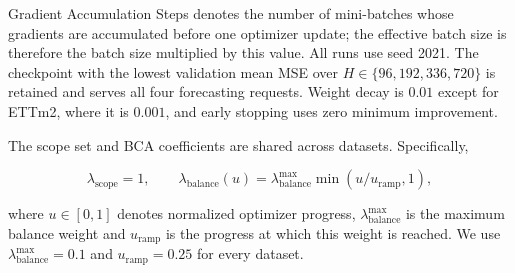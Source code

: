 \documentclass[final,3p,times]{elsarticle}
\begin{document}
Gradient Accumulation Steps denotes the number of mini-batches whose gradients are accumulated before one optimizer update; the effective batch size is therefore the batch size multiplied by this value. All runs use seed 2021. The checkpoint with the lowest validation mean MSE over $H\in\{96,192,336,720\}$ is retained and serves all four forecasting requests. Weight decay is $0.01$ except for ETTm2, where it is $0.001$, and early stopping uses zero minimum improvement.

\begin{table}[t]
\centering
\caption{UVHF configuration.}
\label{tab:model-settings}
\scriptsize
\setlength{\tabcolsep}{4pt}
\end{table}


The scope set and BCA coefficients are shared across datasets.
Specifically,

\begin{equation}
\lambda_{\mathrm{scope}}=1,
\qquad
\lambda_{\mathrm{balance}}(u)
=
\lambda_{\mathrm{balance}}^{\max}
\min\!\left(u/u_{\mathrm{ramp}},1\right),
\end{equation}

where $u\in[0,1]$ denotes normalized optimizer progress, $\lambda_{\mathrm{balance}}^{\max}$ is the maximum balance weight and $u_{\mathrm{ramp}}$ is the progress at which this weight is reached. We use $\lambda_{\mathrm{balance}}^{\max}=0.1$ and $u_{\mathrm{ramp}}=0.25$ for every dataset.
\end{document}
